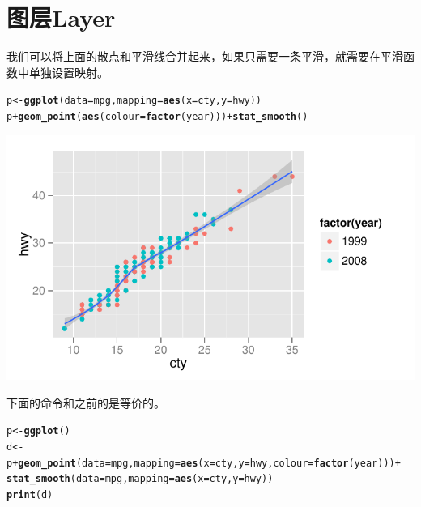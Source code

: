 \documentclass[UTF8,10pt]{ctexart}\usepackage{graphicx, color}
\makeatletter
\def\maxwidth{ %
  \ifdim\Gin@nat@width>\linewidth
    \linewidth
  \else
    \Gin@nat@width
  \fi
}
\newcommand{\hlfunctioncall}[1]{\textcolor[rgb]{0.501960784313725,0,0.329411764705882}{\textbf{#1}}}%
\newenvironment{kframe}{%
 \def\at@end@of@kframe{}%
 \ifinner\ifhmode%
  \def\at@end@of@kframe{\end{minipage}}%
  \begin{minipage}{\columnwidth}%
 \fi\fi%
 \def\FrameCommand##1{\hskip\@totalleftmargin \hskip-\fboxsep
 \colorbox{shadecolor}{##1}\hskip-\fboxsep
     \hskip-\linewidth \hskip-\@totalleftmargin \hskip\columnwidth}%
 \MakeFramed {\advance\hsize-\width
   \@totalleftmargin\z@ \linewidth\hsize
   \@setminipage}}%
 {\par\unskip\endMakeFramed%
 \at@end@of@kframe}
\newenvironment{knitrout}{}{} %
\makeatother
\begin{document}
\section{图层Layer}
我们可以将上面的散点和平滑线合并起来，如果只需要一条平滑，就需要在平滑函数中单独设置映射。
\begin{knitrout}
\color{fgcolor}\begin{kframe}
\begin{alltt}
p <- \hlfunctioncall{ggplot}(data=mpg,mapping=\hlfunctioncall{aes}(x=cty,y=hwy))
p + \hlfunctioncall{geom_point}(\hlfunctioncall{aes}(colour=\hlfunctioncall{factor}(year)))  + \hlfunctioncall{stat_smooth}()
\end{alltt}
\end{kframe}

{\centering \includegraphics[width=\maxwidth]{figure/unnamed-chunk-5} 

}


\end{knitrout}

下面的命令和之前的是等价的。
\begin{knitrout}
\color{fgcolor}\begin{kframe}
\begin{alltt}
p <- \hlfunctioncall{ggplot}()
d <- p + \hlfunctioncall{geom_point}(data=mpg, mapping=\hlfunctioncall{aes}(x=cty,y=hwy,colour=\hlfunctioncall{factor}(year))) + 
         \hlfunctioncall{stat_smooth}(data=mpg, mapping=\hlfunctioncall{aes}(x=cty,y=hwy))
\hlfunctioncall{print}(d)
\end{alltt}
\end{kframe}
\end{knitrout}
\end{document}
